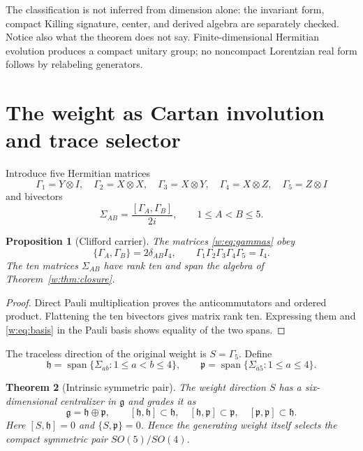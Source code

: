 \documentclass[11pt]{article}
\newtheorem{theorem}{Theorem}[section]
\newtheorem{proposition}[theorem]{Proposition}
\theoremstyle{remark}\newtheorem{remark}[theorem]{Remark}
\begin{document}
The classification is not inferred from dimension alone: the invariant form, compact Killing signature, center, and derived algebra are separately checked.  Notice also what the theorem does not say.  Finite-dimensional Hermitian evolution produces a compact unitary group; no noncompact Lorentzian real form follows by relabeling generators.

\section{The weight as Cartan involution and trace selector}

Introduce five Hermitian matrices
\begin{equation}
\Gamma_1=Y\otimes I,\quad
\Gamma_2=X\otimes X,\quad
\Gamma_3=X\otimes Y,\quad
\Gamma_4=X\otimes Z,\quad
\Gamma_5=Z\otimes I
\label{w:eq:gammas}
\end{equation}
and bivectors
\begin{equation}
\Sigma_{AB}=\frac{[\Gamma_A,\Gamma_B]}{2i},\qquad 1\leq A<B\leq5.
\label{w:eq:sigma}
\end{equation}

\begin{proposition}[Clifford carrier]\label{w:prop:clifford}
The matrices \eqref{w:eq:gammas} obey
\begin{equation}
\{\Gamma_A,\Gamma_B\}=2\delta_{AB}I_4,\qquad
\Gamma_1\Gamma_2\Gamma_3\Gamma_4\Gamma_5=I_4.
\end{equation}
The ten matrices $\Sigma_{AB}$ have rank ten and span the algebra of Theorem~\ref{w:thm:closure}.
\end{proposition}

\begin{proof}
Direct Pauli multiplication proves the anticommutators and ordered product.  Flattening the ten bivectors gives matrix rank ten.  Expressing them and \eqref{w:eq:basis} in the Pauli basis shows equality of the two spans.
\end{proof}

The traceless direction of the original weight is $S=\Gamma_5$.  Define
\begin{equation}
\mathfrak h=\operatorname{span}\{\Sigma_{ab}:1\leq a<b\leq4\},\qquad
\mathfrak p=\operatorname{span}\{\Sigma_{a5}:1\leq a\leq4\}.
\end{equation}

\begin{theorem}[Intrinsic symmetric pair]\label{w:thm:split}
The weight direction $S$ has a six-dimensional centralizer in $\mathfrak g$ and grades it as
\begin{equation}
\mathfrak g=\mathfrak h\oplus\mathfrak p,\qquad
[\mathfrak h,\mathfrak h]\subset\mathfrak h,\quad
[\mathfrak h,\mathfrak p]\subset\mathfrak p,\quad
[\mathfrak p,\mathfrak p]\subset\mathfrak h.
\label{w:eq:symmetricpair}
\end{equation}
Here $[S,\mathfrak h]=0$ and $\{S,\mathfrak p\}=0$.  Hence the generating weight itself selects the compact symmetric pair $SO(5)/SO(4)$.
\end{theorem}
\end{document}
